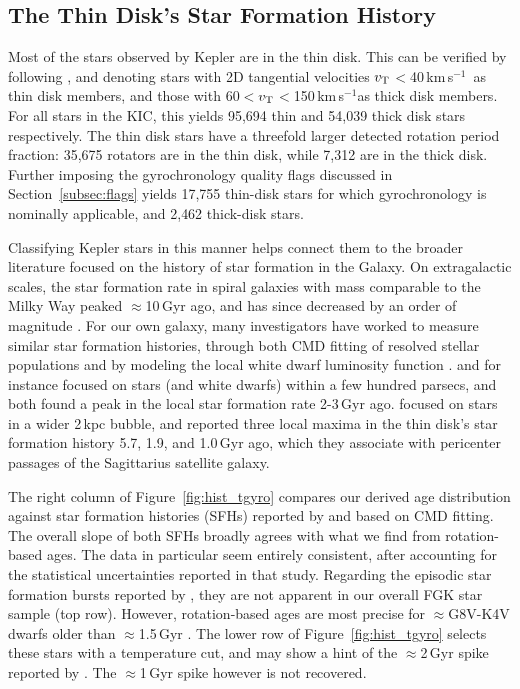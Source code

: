 \documentclass[11pt,twocolumn,tighten]{aastex63}
\newcommand{\kms}{{km\,s$^{-1}$}}
\begin{document}
\subsection{The Thin Disk's Star Formation History}

Most of the stars observed by Kepler are in the thin disk.
This can be verified by following \citet{Gaia_2018}, and denoting stars with 2D tangential
velocities $v_{\rm T}$$<$40\,\kms\ as thin disk members, and those
with 60$<$$v_{\rm T}$$<$150\,\kms as thick disk members.  For all
stars in the KIC, this yields 95{,}694 thin and 54{,}039 thick disk stars respectively.  
The thin disk stars have a threefold larger detected rotation period
fraction: 35{,}675 rotators are in the thin disk, while 7{,}312 are in
the thick disk.  Further imposing the gyrochronology quality flags
discussed in Section~\ref{subsec:flags} yields 17{,}755
thin-disk stars for which gyrochronology is nominally applicable, and
2{,}462 thick-disk stars.

Classifying Kepler stars in this manner helps connect
them to the broader literature focused
on the history of star formation in the Galaxy.  On extragalactic
scales, the star formation rate in spiral galaxies with mass
comparable to the Milky Way peaked $\approx$10\,Gyr ago, and has since
decreased by an order of magnitude
\citep[e.g.][]{2004Natur.428..625H,2006ApJ...651..142H}.  For our own
galaxy, many investigators have worked to measure similar star
formation histories, through both CMD fitting of resolved stellar
populations
\citep[][]{2019A&A...624L...1M,2020NatAs...4..965R,2021MNRAS.501..302A,2022Natur.603..599X}
and by modeling the local white dwarf luminosity function
\citep[e.g.][]{2019ApJ...878L..11I}.  
\citet{2019A&A...624L...1M} and \citet{2019ApJ...878L..11I} for
instance focused on stars (and white dwarfs) within a few hundred
parsecs, and both found a peak in the local star
formation rate 2-3\,Gyr ago.  \citet{2020NatAs...4..965R} focused on
stars in a wider 2\,kpc bubble, and reported three local maxima
in the thin disk's star formation history 5.7, 1.9, and 1.0\,Gyr ago,
which they associate with pericenter passages of the Sagittarius satellite
galaxy.

The right column of Figure~\ref{fig:hist_tgyro} compares our derived age distribution
against star formation histories (SFHs) reported by
\citet{2019A&A...624L...1M} and \citet{2020NatAs...4..965R} based on
CMD fitting.
The overall slope of both SFHs broadly agrees with what we find from rotation-based ages.
The \citet{2019A&A...624L...1M} data in particular seem entirely consistent, after
accounting for the statistical uncertainties reported in that study.
Regarding the episodic star formation bursts reported by
\citet{2020NatAs...4..965R}, they are not apparent in our overall FGK star sample (top row).
However, rotation-based ages are most precise for $\approx$G8V-K4V dwarfs older than $\approx$1.5\,Gyr
\citep{Bouma_2023}.
The lower row of Figure~\ref{fig:hist_tgyro} selects these stars with a temperature cut, and
may show a hint of the $\approx$2\,Gyr spike reported by 
\citet{2020NatAs...4..965R}.
The $\approx$1\,Gyr spike however is not recovered.
\end{document}

